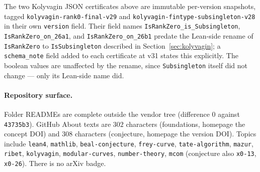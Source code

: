 \begin{honesty}
The two Kolyvagin JSON certificates above are immutable per-version
snapshots, tagged \texttt{kolyvagin-rank0-final-v29} and
\texttt{kolyvagin-fintype-subsingleton-v28} in their own
\texttt{version} field. Their field names
\texttt{IsRankZero\_is\_Subsingleton}, \texttt{IsRankZero\_on\_26a1},
and \texttt{IsRankZero\_on\_26b1} predate the Lean-side rename of
\texttt{IsRankZero} to \texttt{IsSubsingleton} described in
Section~\ref{sec:kolyvagin}; a \texttt{schema\_note} field added to
each certificate at v31 states this explicitly. The boolean values
are unaffected by the rename, since \texttt{Subsingleton} itself did
not change --- only its Lean-side name did.
\end{honesty}

\paragraph{Repository surface.}
Folder READMEs are complete outside the vendor tree (difference $0$
against \texttt{43735b3}). GitHub About texts are $302$ characters
(foundations, homepage the concept DOI) and $308$ characters
(conjecture, homepage the version DOI). Topics include
\texttt{lean4}, \texttt{mathlib}, \texttt{beal-conjecture},
\texttt{frey-curve}, \texttt{tate-algorithm}, \texttt{mazur},
\texttt{ribet}, \texttt{kolyvagin}, \texttt{modular-curves},
\texttt{number-theory}, \texttt{mcom} (conjecture also
\texttt{x0-13}, \texttt{x0-26}). There is no arXiv badge.

